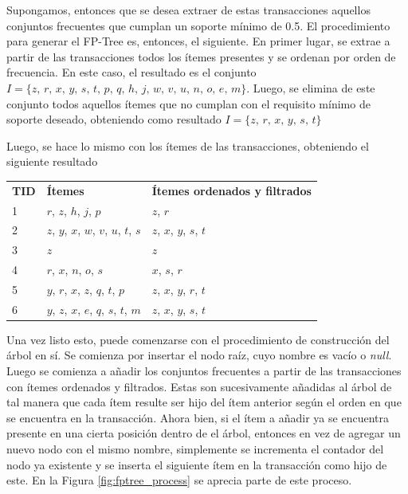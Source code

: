 Supongamos, entonces que se desea extraer de estas transacciones aquellos conjuntos frecuentes que cumplan un soporte mínimo de 0.5. El procedimiento para generar el FP-Tree es, entonces, el siguiente. En primer lugar, se extrae a partir de las transacciones todos los ítemes presentes y se ordenan por orden de frecuencia. En este caso, el resultado es el conjunto $I = \{z, \, r, \, x, \, y, \, s, \, t, \, p, \, q, \, h, \, j, \, w, \, v, \, u, \, n, \, o, \, e, \, m\}$. Luego, se elimina de este conjunto todos aquellos ítemes que no cumplan con el requisito mínimo de soporte deseado, obteniendo como resultado $I = \{z, \, r, \, x, \, y, \, s, \, t\}$

Luego, se hace lo mismo con los ítemes de las transacciones, obteniendo el siguiente resultado

\begin{tabular}{l l l}
\textbf{TID} & \textbf{Ítemes} & \textbf{Ítemes ordenados y filtrados} \\
1 & $r$, $z$, $h$, $j$, $p$ & $z$, $r$ \\
2 & $z$, $y$, $x$, $w$, $v$, $u$, $t$, $s$ & $z$, $x$, $y$, $s$, $t$ \\
3 & $z$ & $z$ \\
4 & $r$, $x$, $n$, $o$, $s$ & $x$, $s$, $r$ \\
5 & $y$, $r$, $x$, $z$, $q$, $t$, $p$ & $z$, $x$, $y$, $r$, $t$ \\
6 & $y$, $z$, $x$, $e$, $q$, $s$, $t$, $m$ & $z$, $x$, $y$, $s$, $t$ \\
\end{tabular}

Una vez listo esto, puede comenzarse con el procedimiento de construcción del árbol en sí. Se comienza por insertar el nodo raíz, cuyo nombre es vacío o \textit{null}. Luego se comienza a añadir los conjuntos frecuentes a partir de las transacciones con ítemes ordenados y filtrados. Estas son sucesivamente añadidas al árbol de tal manera que cada ítem resulte ser hijo del ítem anterior según el orden en que se encuentra en la transacción. Ahora bien, si el ítem a añadir ya se encuentra presente en una cierta posición dentro de el árbol, entonces en vez de agregar un nuevo nodo con el mismo nombre, simplemente se incrementa el contador del nodo ya existente y se inserta el siguiente ítem en la transacción como hijo de este. En la Figura \ref{fig:fptree_process} se aprecia parte de este proceso.

